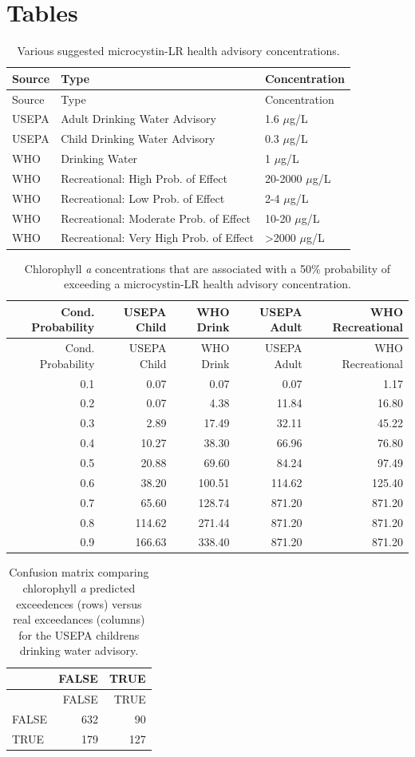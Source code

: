 \documentclass[11pt,]{article}
\begin{document}
\newpage

\section{Tables}\label{tables}

\begin{longtable}[c]{@{}lll@{}}
\caption{Various suggested microcystin-LR health advisory
concentrations. \label{tab:microcystin_levels}}\tabularnewline
\toprule
Source & Type & Concentration\tabularnewline
\midrule
\endfirsthead
\toprule
Source & Type & Concentration\tabularnewline
\midrule
\endhead
USEPA & Adult Drinking Water Advisory & 1.6 \(\mu\)g/L\tabularnewline
USEPA & Child Drinking Water Advisory & 0.3 \(\mu\)g/L\tabularnewline
WHO & Drinking Water & 1 \(\mu\)g/L\tabularnewline
WHO & Recreational: High Prob. of Effect & 20-2000
\(\mu\)g/L\tabularnewline
WHO & Recreational: Low Prob. of Effect & 2-4 \(\mu\)g/L\tabularnewline
WHO & Recreational: Moderate Prob. of Effect & 10-20
\(\mu\)g/L\tabularnewline
WHO & Recreational: Very High Prob. of Effect & \textgreater{}2000
\(\mu\)g/L\tabularnewline
\bottomrule
\end{longtable}

\newpage

\begin{longtable}[c]{@{}rrrrr@{}}
\caption{Chlorophyll \textit{a} concentrations that are associated with
a 50\% probability of exceeding a microcystin-LR health advisory
concentration. \label{tab:mc_chla_table}}\tabularnewline
\toprule
Cond. Probability & USEPA Child & WHO Drink & USEPA Adult & WHO
Recreational\tabularnewline
\midrule
\endfirsthead
\toprule
Cond. Probability & USEPA Child & WHO Drink & USEPA Adult & WHO
Recreational\tabularnewline
\midrule
\endhead
0.1 & 0.07 & 0.07 & 0.07 & 1.17\tabularnewline
0.2 & 0.07 & 4.38 & 11.84 & 16.80\tabularnewline
0.3 & 2.89 & 17.49 & 32.11 & 45.22\tabularnewline
0.4 & 10.27 & 38.30 & 66.96 & 76.80\tabularnewline
0.5 & 20.88 & 69.60 & 84.24 & 97.49\tabularnewline
0.6 & 38.20 & 100.51 & 114.62 & 125.40\tabularnewline
0.7 & 65.60 & 128.74 & 871.20 & 871.20\tabularnewline
0.8 & 114.62 & 271.44 & 871.20 & 871.20\tabularnewline
0.9 & 166.63 & 338.40 & 871.20 & 871.20\tabularnewline
\bottomrule
\end{longtable}

\newpage

\begin{longtable}[c]{@{}lrr@{}}
\caption{Confusion matrix comparing chlorophyll \textit{a} predicted
exceedences (rows) versus real exceedances (columns) for the USEPA
childrens drinking water advisory.
\label{tab:child_conmat_table}}\tabularnewline
\toprule
& FALSE & TRUE\tabularnewline
\midrule
\endfirsthead
\toprule
& FALSE & TRUE\tabularnewline
\midrule
\endhead
FALSE & 632 & 90\tabularnewline
TRUE & 179 & 127\tabularnewline
\bottomrule
\end{longtable}
\end{document}
